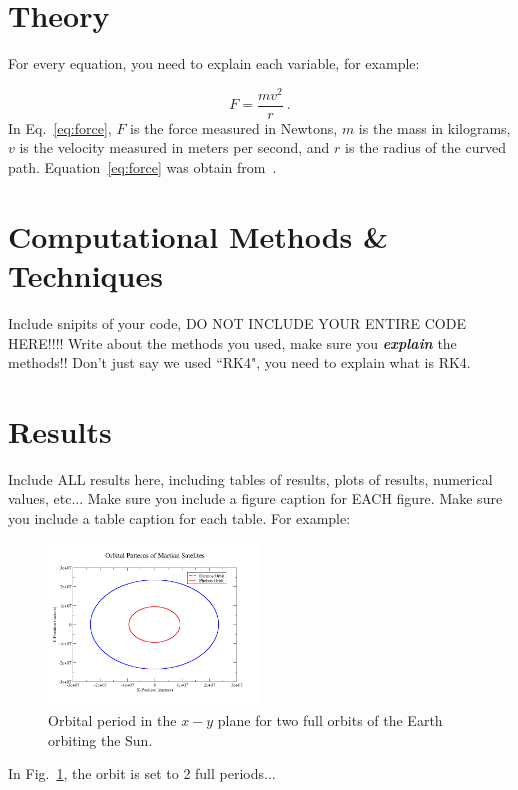 \documentclass[11pt]{article}
\begin{document}
\section{Theory}
\noindent For every equation, you need to explain each variable, for example:

\begin{equation}
\label{eq:force}
F=\dfrac{mv^2}{r}~.
\end{equation}
\noindent In Eq.~\eqref{eq:force}, $F$ is the force measured in Newtons, $m$ is the
mass in kilograms, $v$ is the velocity measured in meters per second, and $r$ is
the radius of the curved path.  Equation~\eqref{eq:force} was obtain from~\cite{uni}.


\section{Computational Methods \& Techniques}
\noindent Include snipits of your code, DO NOT INCLUDE YOUR ENTIRE CODE HERE!!!!  
Write about the methods you used, make sure you \textbf{\textit{explain}} the methods!!  Don't
just say we used ``RK4", you need to explain what is RK4.

\section{Results}
\noindent Include ALL results here, including tables of results, plots of results, numerical values, etc...
Make sure you include a figure caption for EACH figure.  Make sure you include a table caption for each table.
For example:
\begin{figure}[ht]
\centering
\includegraphics[width=0.5\textwidth, angle =0]{../images/orbits}
\caption{Orbital period in the $x-y$ plane for two full orbits of the Earth orbiting the Sun.}
\label{fig:graph}
\end{figure}
\noindent In Fig.~\ref{fig:graph}, the orbit is set to 2 full periods...
\end{document}
